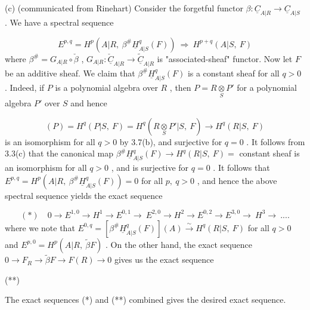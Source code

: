 (c)  (communicated from Rinehart) Consider the forgetful functor $\beta : \underline{C}_{A|R} \to \underline{C}_{A|S}$ . We have a spectral sequence

\begin{equation*}
E^{p,q} = H^{p}(A|R,\ \beta^{\#}\underline{H}^{q}_{A|S}(F))\ \Longrightarrow\ H^{p+q}(A|S,\ F)
\end{equation*}
where  $\beta^{\#} = G_{A|R}\circ\check{\beta}$ ,  $G_{A|R} : \underline{\check{C}}_{A|R} \to \underline{\widetilde{C}}_{A|R}$  is "associated-sheaf"  functor. Now let  $F$  be an additive sheaf. We claim that  $\beta^{\#}\underline{H}^{q}_{A|S}(F)$  is a constant sheaf for all  $q > 0$ . Indeed, if  $P$  is a polynomial algebra over  $R$ , then  $P = R\underset{S}{\otimes}P'$ for a polynomial algebra  $P'$  over  $S$  and hence

\begin{equation*}
[\beta^{\#}\underline{H}^{q}_{A|S}(F)](P) = H^{q}(P|S,\ F) = H^{q}(R\underset{S}{\otimes}P'|S,\ F) \to H^{q}(R|S,\ F)
\end{equation*}
is an isomorphism for all  $q > 0$  by 3.7(b), and surjective for  $q = 0$ . It follows from 3.3(c) that the canonical map  $\beta^{\#}\underline{H}^{q}_{A|S}(F) \to H^{q}(R|S,\ F) =$ constant sheaf is an isomorphism for all  $q > 0$ , and is surjective for  $q = 0$ . It follows that $E^{p,q} = H^{p}(A|R,\ \beta^{\#}\underline{H}^{q}_{A|S}(F)) = 0$  for all  $p,\ q > 0$ , and hence the above spectral sequence yields the exact sequence

\begin{equation*}
(*)\quad 0 \to E^{1,0} \to H^{1} \to E^{0,1}\!\to\ E^{2,0} \to H^{2} \to E^{0,2} \to E^{3,0}\!\to\ H^{3} \to\ ....
\end{equation*}
where we note that  $E^{0,q} = [\beta^{\#}\underline{H}^{q}_{A|S}(F)](A) \overset{\sim}{\to} H^{q}(R|S,\ F)$  for all  $q > 0$  and $E^{p,0} = H^{p}(A|R,\ \widetilde{\beta}F)$ . On the other hand, the exact sequence  $0 \to F_{R} \to \widetilde{\beta}F \to F(R) \to 0$ gives us the exact sequence

(**)\quad{}
The exact sequences (*) and (**) combined gives the desired exact sequence.



